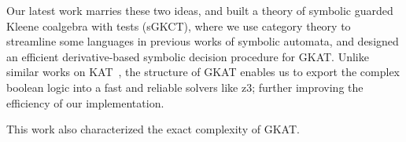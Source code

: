\documentclass[11pt,a4paper,sans]{moderncv} %
\begin{document}
Our latest work marries these two ideas, and built a theory of symbolic guarded Kleene coalgebra with tests (sGKCT), where we use category theory to streamline some languages in previous works of symbolic automata, and designed an efficient derivative-based symbolic decision procedure for GKAT. 
Unlike similar works on KAT~\cite{pous_SymbolicAlgorithmsLanguage_2015}, the structure of GKAT enables us to export the complex boolean logic into a fast and reliable solvers like z3; further improving the efficiency of our implementation.

This work also characterized the exact complexity of GKAT.





\newpage
\printbibliography %
\end{document}

